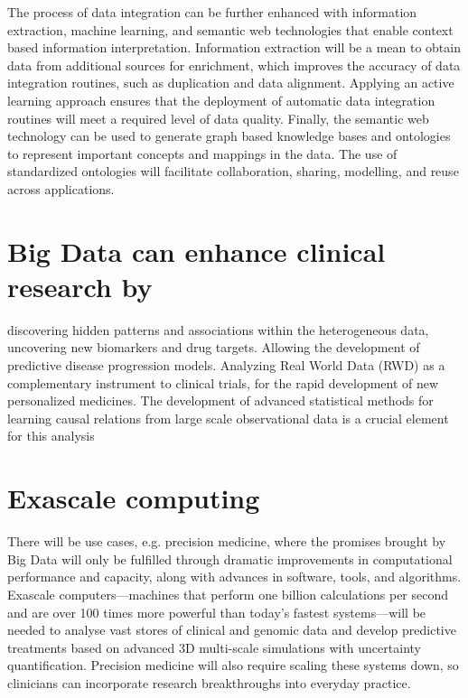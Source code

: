 \documentclass[sigconf]{acmart}
\begin{document}
The process of data integration can be further enhanced with information extraction, machine
learning, and semantic web technologies that enable context based information interpretation.
Information extraction will be a mean to obtain data from additional sources for enrichment, which
improves the accuracy of data integration routines, such as duplication and data alignment. Applying
an active learning approach ensures that the deployment of automatic data integration routines will
meet a required level of data quality. Finally, the semantic web technology can be used to generate
graph based knowledge bases and ontologies to represent important concepts and mappings in the
data. The use of standardized ontologies will facilitate collaboration, sharing, modelling, and reuse
across applications. 

\section{Big Data can enhance clinical research by}
discovering hidden patterns and associations within the heterogeneous data, uncovering new
biomarkers and drug targets. Allowing the development of predictive disease progression models. Analyzing Real World Data (RWD) as a complementary instrument to clinical trials, for the rapid development of new personalized medicines. The development of advanced statistical methods for learning causal relations from large scale observational data is a crucial element
for this analysis

\section{Exascale computing}
There will be use cases, e.g. precision medicine, where the promises brought by Big Data will only be
fulfilled through dramatic improvements in computational performance and capacity, along with
advances in software, tools, and algorithms. Exascale computers—machines that perform one billion
calculations per second and are over 100 times more powerful than today’s fastest systems—will be
needed to analyse vast stores of clinical and genomic data and develop predictive treatments based
on advanced 3D multi-scale simulations with uncertainty quantification. Precision medicine will also
require scaling these systems down, so clinicians can incorporate research breakthroughs into
everyday practice. 
\end{document}
